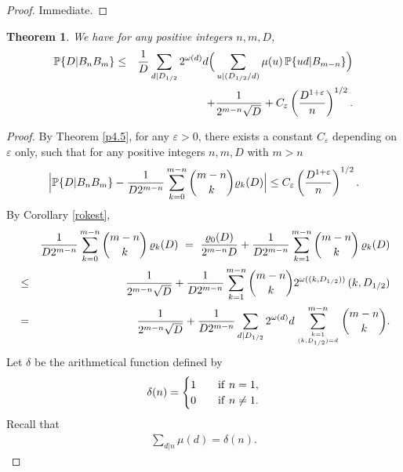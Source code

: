\documentclass[11pt,draft,reqno]{amsart}
\newtheorem{theorem}{Theorem}[section]
\theoremstyle{definition}
\theoremstyle{remarks}
\numberwithin{equation}{section}
\def \d{{\delta}}
\def \e{{\varepsilon}}
\def \o{{\omega}}
\def \p{{\varphi}}
\def \m{{\mu}}
\def\P{{\mathcal P}}
\def\P{{\mathbb P}}
\begin{document}
\begin{proof}Immediate. 
\end{proof}
\begin{theorem} \label{bnmbound} We have for any positive integers $n,m,D$,  
\begin{eqnarray*}   \P \{ D|B_nB_m \} 
 &\le &{1  \over D }\sum_{d| D_{1/2} } 2^{\o (d)}d
 \Big(\sum_{u|  (D_{1/2}/d )}\m(u)\, \P\{ud|B_{m-n}\}\Big)
\cr &  &   +{1\over 2^{  m-n }\sqrt D } +C_\e
\left({     D  ^{1 + \e}\over   n }\right)^{1/2 }. 
\end{eqnarray*} 
   \end{theorem}  
\begin{proof} By Theorem \ref{p4.5},
 for any $\e>0$, there exists a constant $C_\e$ depending on $\e$ only, such that  for any
 positive  integers
 $n,m, D$ with 
 $m>n$
\begin{equation}\label{4.11a} \Big|\P \{ D|B_nB_m \}-  {1\over D  2^{ m-n}} \sum_{k=0}^{m-n} { {{m-n}\choose {k}}     } \varrho_k(D) 
\Big|
\le C_\e
\left({     D  ^{1 + \e}\over   n }\right)^{1/2 }. 
\end{equation} 
 By Corollary \ref{rokest}, 
\begin{eqnarray}\label{323}
& & {1\over D  2^{ m-n}}  \sum_{k=0}^{m-n}   {{m-n}\choose {k}} \,  \varrho_k(D)
\ = \  {\varrho_0(D)\over 2^{ 
m-n }D }+{1\over D  2^{ m-n}} 
\sum_{k=1}^{m-n}   {{m-n}\choose {k}}\,
 \varrho_k(D)  
\cr &  \le  &  {1\over 2^{  m-n }\sqrt D }+  {1  \over D 2^{  m-n }}  \sum_{k=1}^{m-n}   {{m-n}\choose {k}} 2^{\o ((k, D_{1/2}))}\, (k, D_{1/2})
\cr & =  &  {1\over 2^{  m-n }\sqrt D }+ 
 {1  \over D 2^{  m-n }}\sum_{d| D_{1/2}} 2^{\o (d)}d
 \sum_{k=1\atop (k, D_{1/2})=d}^{m-n}   {{m-n}\choose {k}}  
 .\end{eqnarray}
Let $\d$ be the arithmetical function defined by
\begin{eqnarray} \label{Delta}   \d(n)=\begin{cases}1\quad & {\rm if}\ n=1,\cr
0\quad & {\rm if}\ n \not=1. \end{cases} \end{eqnarray} Recall that 
\begin{eqnarray} \label{sp} \sum_{d|n}\m(d)=\d(n) . \end{eqnarray} 
 

\end{proof}
\end{document}

